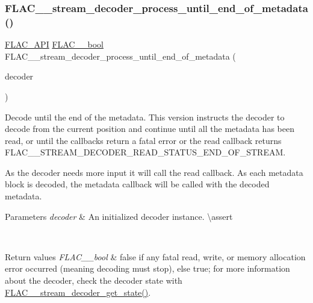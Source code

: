 \subsubsection{\texorpdfstring{FLAC\_\_stream\_decoder\_process\_until\_end\_of\_metadata()}{FLAC\_\_stream\_decoder\_process\_until\_end\_of\_metadata()}}
{\footnotesize\ttfamily \mbox{\hyperlink{group__flac__export_ga56ca07df8a23310707732b1c0007d6f5}{F\+L\+A\+C\+\_\+\+A\+PI}} \mbox{\hyperlink{ordinals_8h_a95103469f1cbd78b8cf250194985b34e}{F\+L\+A\+C\+\_\+\+\_\+bool}} F\+L\+A\+C\+\_\+\+\_\+stream\+\_\+decoder\+\_\+process\+\_\+until\+\_\+end\+\_\+of\+\_\+metadata (\begin{DoxyParamCaption}\item[{\mbox{\hyperlink{struct_f_l_a_c_____stream_decoder}{F\+L\+A\+C\+\_\+\+\_\+\+Stream\+Decoder}} $\ast$}]{decoder }\end{DoxyParamCaption})}

Decode until the end of the metadata. This version instructs the decoder to decode from the current position and continue until all the metadata has been read, or until the callbacks return a fatal error or the read callback returns {\ttfamily F\+L\+A\+C\+\_\+\+\_\+\+S\+T\+R\+E\+A\+M\+\_\+\+D\+E\+C\+O\+D\+E\+R\+\_\+\+R\+E\+A\+D\+\_\+\+S\+T\+A\+T\+U\+S\+\_\+\+E\+N\+D\+\_\+\+O\+F\+\_\+\+S\+T\+R\+E\+AM}.

As the decoder needs more input it will call the read callback. As each metadata block is decoded, the metadata callback will be called with the decoded metadata.


\begin{DoxyParams}{Parameters}
{\em decoder} & An initialized decoder instance. \textbackslash{}assert 
\begin{DoxyCode}{1}
\end{DoxyCode}
 \\
\hline
\end{DoxyParams}

\begin{DoxyRetVals}{Return values}
{\em F\+L\+A\+C\+\_\+\+\_\+bool} & {\ttfamily false} if any fatal read, write, or memory allocation error occurred (meaning decoding must stop), else {\ttfamily true}; for more information about the decoder, check the decoder state with \mbox{\hyperlink{group__flac__stream__decoder_ga5899c204ad7183ec04e41855090c0635}{F\+L\+A\+C\+\_\+\+\_\+stream\+\_\+decoder\+\_\+get\+\_\+state()}}. \\
\hline
\end{DoxyRetVals}
\mbox{\label{group__flac__stream__decoder_ga4544352442870ea9f16f388a97d81dff}} 
